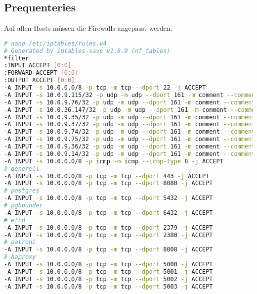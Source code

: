 
\begin{flushleft}
    \subsection{Prequenteries}
    Auf allen Hosts müssen die Firewalls angepasst werden:
    \lstset{style=gra_codestyle}
    \begin{lstlisting}[language=bash, caption=Testsystem - Firewall Settings,captionpos=b,label={lst:testsystem-installation-firewall},breaklines=true]
# nano /etc/iptables/rules.v4
# Generated by iptables-save v1.8.9 (nf_tables)
*filter
:INPUT ACCEPT [0:0]
:FORWARD ACCEPT [0:0]
:OUTPUT ACCEPT [0:0]
-A INPUT -s 10.0.0.0/8 -p tcp -m tcp --dport 22 -j ACCEPT
-A INPUT -s 10.0.9.115/32 -p udp -m udp --dport 161 -m comment --comment "Allow SNMP for probe 10.0.9.115" -j ACCEPT
-A INPUT -s 10.0.9.76/32 -p udp -m udp --dport 161 -m comment --comment "Allow SNMP for probe 10.0.9.76" -j ACCEPT
-A INPUT -s 10.0.36.147/32 -p udp -m udp --dport 161 -m comment --comment "Allow SNMP for probe 10.0.36.147" -j ACCEPT
-A INPUT -s 10.0.9.35/32 -p udp -m udp --dport 161 -m comment --comment "Allow SNMP for probe 10.0.9.35" -j ACCEPT
-A INPUT -s 10.0.9.37/32 -p udp -m udp --dport 161 -m comment --comment "Allow SNMP for probe 10.0.9.37" -j ACCEPT
-A INPUT -s 10.0.9.74/32 -p udp -m udp --dport 161 -m comment --comment "Allow SNMP for probe 10.0.9.74" -j ACCEPT
-A INPUT -s 10.0.9.75/32 -p udp -m udp --dport 161 -m comment --comment "Allow SNMP for probe 10.0.9.75" -j ACCEPT
-A INPUT -s 10.0.9.36/32 -p udp -m udp --dport 161 -m comment --comment "Allow SNMP for probe 10.0.9.36" -j ACCEPT
-A INPUT -s 10.0.9.14/32 -p udp -m udp --dport 161 -m comment --comment "Allow SNMP for probe 10.0.9.14" -j ACCEPT
-A INPUT -s 10.0.0.0/8 -p icmp -m icmp --icmp-type 8 -j ACCEPT
# generell
-A INPUT -s 10.0.0.0/8 -p tcp -m tcp --dport 443 -j ACCEPT
-A INPUT -s 10.0.0.0/8 -p tcp -m tcp --dport 8080 -j ACCEPT
# postgres
-A INPUT -s 10.0.0.0/8 -p tcp -m tcp --dport 5432 -j ACCEPT
# pgbounder
-A INPUT -s 10.0.0.0/8 -p tcp -m tcp --dport 6432 -j ACCEPT
# etcd
-A INPUT -s 10.0.0.0/8 -p tcp -m tcp --dport 2379 -j ACCEPT
-A INPUT -s 10.0.0.0/8 -p tcp -m tcp --dport 2380 -j ACCEPT
# patroni
-A INPUT -s 10.0.0.0/8 -p tcp -m tcp --dport 8008 -j ACCEPT
# haproxy
-A INPUT -s 10.0.0.0/8 -p tcp -m tcp --dport 5000 -j ACCEPT
-A INPUT -s 10.0.0.0/8 -p tcp -m tcp --dport 5001 -j ACCEPT
-A INPUT -s 10.0.0.0/8 -p tcp -m tcp --dport 5002 -j ACCEPT
-A INPUT -s 10.0.0.0/8 -p tcp -m tcp --dport 5003 -j ACCEPT

\end{lstlisting}
\end{flushleft}
